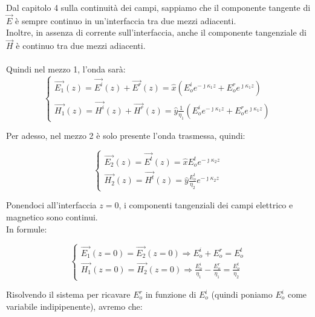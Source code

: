 Dal capitolo 4 sulla continuità dei campi, sappiamo che il componente tangente di $\vec{E}$ è sempre continuo in un'interfaccia tra due mezzi adiacenti. \\ 
Inoltre, in assenza di corrente sull'interfaccia, anche il componente tangenziale di $\vec{H}$ è continuo tra due mezzi adiacenti. \\ \\ 

Quindi nel mezzo 1, l'onda sarà: \\ 

{\Large \begin{equation}
    \begin{cases}
        \vec{E_1 }(z) = \vec{E^{i}} (z) + \vec{E^{r} }(z) = \hat{x} (E_o ^{i} e^{-\jmath \kappa_1 z} + E_o ^{r} e^{\jmath \kappa_1 z} ) \\ 
        \vec{H_1} (z) = \vec{H^{i}} (z) + \vec{H^{r}} (z) = \hat{y} \frac{1}{\eta_1} (E_o ^{i} e^{-\jmath \kappa_1 z} + E_o ^{r} e^{\jmath \kappa_1 z} )    
    \end{cases}
\end{equation}}

Per adesso, nel mezzo 2 è solo presente l'onda trasmessa, quindi: 

{\Large \begin{equation}
    \begin{cases}
        \vec{E_2} (z) = \vec{E^{t}} (z) = \hat{x} E_o ^{t} e^{-\jmath \kappa_2 z} \\ 
        \vec{H_2} (z) = \vec{H^{t}} (z) = \hat{y} \frac{E_o ^{t}}{\eta_2} e^{-\jmath \kappa_2 z}    
    \end{cases}
\end{equation}}

Ponendoci all'interfaccia $z = 0$, i componenti tangenziali dei campi elettrico e magnetico sono continui. \\ 

In formule: 

{\Large \begin{equation}
    \begin{cases}
        \vec{E_1} (z = 0) = \vec{E_2} (z= 0) \Rightarrow E_o ^{i} + E_o ^{r} = E_o ^{t} \\ 
        \vec{H_1} (z = 0) = \vec{H_2} (z= 0) \Rightarrow \frac{E_o ^{i}}{\eta_1} - \frac{E_o ^{r}}{\eta_1} = \frac{E_o ^{t}}{\eta_2} 
    \end{cases}
\end{equation}}

Risolvendo il sistema per ricavare $E_o ^{r}$ in funzione di $E_o ^{i}$ (quindi poniamo $E_o ^{i}$ come variabile indipipenente), 
avremo che: 

